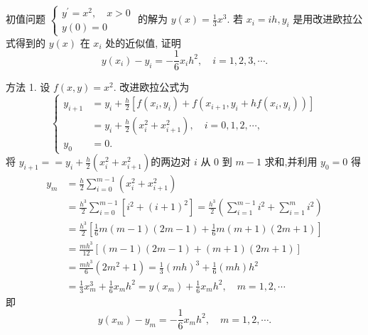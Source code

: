     \begin{tcolorbox}[enhanced,colback=8,colframe=7,breakable,coltitle=green!25!black,title=2024]
    
 初值问题
$
\left\{\begin{array}{l}
y^{\prime}=x^{2}, \quad x>0 \\
y(0)=0
\end{array}\right.
$
的解为 $ y(x)=\frac{1}{3} x^{3} $. 若 $ x_{i}=i h, y_{i} $ 是用改进欧拉公式得到的 $ y(x) $ 在 $ x_{i} $ 处的近似值, 证明
$$
y\left(x_{i}\right)-y_{i}=-\frac{1}{6} x_{i} h^{2}, \quad i=1,2,3, \cdots .
$$
\tcblower

 方法 1. 设 $ f(x, y)=x^{2} $. 改进欧拉公式为
$$
\left\{\begin{aligned}
y_{i+1} & =y_{i}+\frac{h}{2}\left[f\left(x_{i}, y_{i}\right)+f\left(x_{i+1}, y_{i}+h f\left(x_{i}, y_{i}\right)\right)\right] \\
& =y_{i}+\frac{h}{2}\left(x_{i}^{2}+x_{i+1}^{2}\right), \quad i=0,1,2, \cdots, \\
y_{0} & =0 .
\end{aligned}\right.
$$
将 $y_{i+1}==y_{i}+\frac{h}{2}\left(x_{i}^{2}+x_{i+1}^{2}\right) $的两边对 $ i $ 从 0 到 $ m-1 $ 求和,并利用 $y_0=0$ 得 
$$
\begin{aligned}
y_{m} & =\frac{h}{2} \sum_{i=0}^{m-1}\left(x_{i}^{2}+x_{i+1}^{2}\right) \\
& =\frac{h^{3}}{2} \sum_{i=0}^{m-1}\left[i^{2}+(i+1)^{2}\right]=\frac{h^{3}}{2}\left(\sum_{i=1}^{m-1} i^{2}+\sum_{i=1}^{m} i^{2}\right) \\
& =\frac{h^{3}}{2}\left[\frac{1}{6} m(m-1)(2 m-1)+\frac{1}{6} m(m+1)(2 m+1)\right] \\
& =\frac{m h^{3}}{12}[(m-1)(2 m-1)+(m+1)(2 m+1)] \\
& =\frac{m h^{3}}{6}\left(2 m^{2}+1\right)=\frac{1}{3}(m h)^{3}+\frac{1}{6}(m h) h^{2} \\
& =\frac{1}{3} x_{m}^{3}+\frac{1}{6} x_{m} h^{2}=y\left(x_{m}\right)+\frac{1}{6} x_{m} h^{2}, \quad m=1,2, \cdots
\end{aligned}
$$
即
$$
y\left(x_{m}\right)-y_{m}=-\frac{1}{6} x_{m} h^{2}, \quad m=1,2, \cdots .
$$


\end{tcolorbox}
